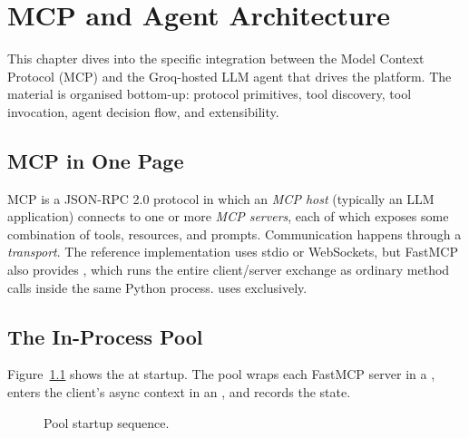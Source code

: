 \chapter{MCP and Agent Architecture}
\label{ch:mcp}

This chapter dives into the specific integration between the Model
Context Protocol (MCP) and the Groq-hosted LLM agent that drives the
platform. The material is organised bottom-up: protocol primitives,
tool discovery, tool invocation, agent decision flow, and
extensibility.

\section{MCP in One Page}
\label{sec:mcp-onepager}

MCP \citep{mcpSpec2024, anthropic2024mcp} is a JSON-RPC 2.0 protocol
in which an \emph{MCP host} (typically an LLM application) connects
to one or more \emph{MCP servers}, each of which exposes some
combination of tools, resources, and prompts. Communication happens
through a \emph{transport}. The reference implementation uses stdio
or WebSockets, but FastMCP \citep{fastmcp} also provides
, which runs the entire client/server exchange
as ordinary  method calls inside the same Python
process. \projname{} uses  exclusively.

\section{The In-Process Pool}
\label{sec:in-process-pool}

Figure~\ref{fig:pool} shows the  at startup. The
pool wraps each FastMCP server in a ,
enters the client's async context in an , and
records the state.

\begin{figure}[H]
\centering
{}
\caption{Pool startup sequence.}
\label{fig:pool}
\end{figure}

